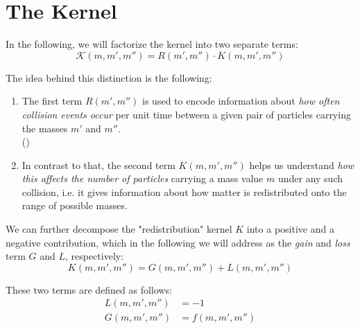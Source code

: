 
\newpage\section{The Kernel}

    In the following, we will factorize the kernel into two separate terms:
    \begin{equation}
        \mathcal K(m,m',m'') = R(m',m'') \cdot K(m,m',m'') 
    \end{equation}

    The idea behind this distinction is the following: 
    \begin{enumerate}
        \item The first term $R(m',m'')$ is used to encode information about 
            \textit{how often collision events occur} per unit time between a given
            pair of particles carrying the masses $m'$ and $m''$. \\
            ()
        \item In contrast to that, the second term $K(m,m',m'')$ helps us understand 
            \textit{how this affects the number of particles} carrying a mass value $m$ under any
            such collision, i.e. it gives information about how matter is redistributed onto the
            range of possible masses.
    \end{enumerate}


    We can further decompose the "redistribution" kernel $K$ into a positive and a negative
    contribution, which in the following we will address as the \textit{gain} and \textit{loss} 
    term $G$ and $L$, respectively:
    \begin{equation}
        K(m,m',m'') = G(m, m', m'') + L(m, m', m'')
    \end{equation}

    These two terms are defined as follows:
    \begin{align}
        L(m, m', m'') &= -1 \\
        G(m, m', m'') &= f(m, m', m'')
    \end{align}

